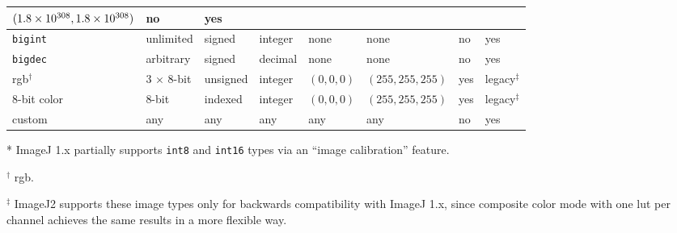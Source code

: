\documentclass{bmcart}
\begin{document}
\begin{backmatter}
\begin{table}[h!]
\begin{tabular}{| l | l | l | p{0.4in} | p{0.8in} | p{0.8in} | l | l |}
{                                                                                                                        $(1.8 \times 10^{308},\\
                                                                                                                        1.8 \times 10^{308})$
                                                                                                                        }                      & no                  & yes               \\ \hline
      \texttt{bigint}          & unlimited          & signed              & integer         & none                    & none                   & no                  & yes               \\ \hline
      \texttt{bigdec}          & arbitrary          & signed              & decimal         & none                    & none                   & no                  & yes               \\ \hline
      \acrshort{rgb}$^\dagger$ & 3 $\times$ 8-bit   & unsigned            & integer         & $(0, 0, 0)$             & $(255, 255, 255)$      & yes                 & legacy$^\ddagger$ \\ \hline
      8-bit color              & 8-bit              & indexed             & integer         & $(0, 0, 0)$             & $(255, 255, 255)$      & yes                 & legacy$^\ddagger$ \\ \hline
      custom                   & any                & any                 & any             & any                     & any                    & no                  & yes               \\ \hline
    \end{tabular}
    \begin{flushleft}
      * ImageJ 1.x partially supports \texttt{int8} and \texttt{int16} types
      via an ``image calibration'' feature.

      $^\dagger$ \acrfull{rgb}.

      $^\ddagger$ ImageJ2 supports these image types only for backwards
      compatibility with ImageJ 1.x, since composite color mode with one
      \acrshort{lut} per channel achieves the same results in a more flexible
      way.
    \end{flushleft}
  \end{table}

\end{backmatter}
\end{document}
